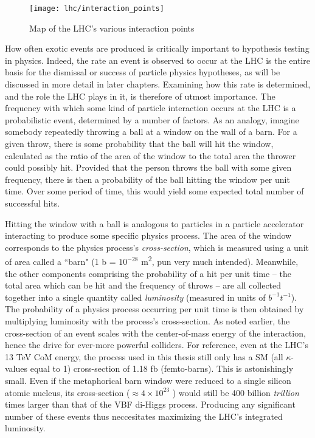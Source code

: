     \begin{figure}[h]
        \texttt{[image: lhc/interaction\_points]}
        \caption{Map of the LHC's various interaction points \cite{lhc_machine}}
        \label{fig:interaction_points}
    \end{figure}

    \FloatBarrier

    How often exotic events are produced is critically important to hypothesis testing in physics.
    Indeed, the rate an event is observed to occur at the LHC is the entire basis for the dismissal or success of particle physics hypotheses, as will be discussed in more detail in later chapters.
    Examining how this rate is determined, and the role the LHC plays in it, is therefore of utmost importance.
    The frequency with which some kind of particle interaction occurs at the LHC is a probabilistic event, determined by a number of factors.
    As an analogy, imagine somebody repeatedly throwing a ball at a window on the wall of a barn.
    For a given throw, there is some probability that the ball will hit the window, calculated as the ratio of the area of the window to the total area the thrower could possibly hit.
    Provided that the person throws the ball with some given frequency, there is then a probability of the ball hitting the window per unit time.
    Over some period of time, this would yield some expected total number of successful hits.

    

    Hitting the window with a ball is analogous to particles in a particle accelerator interacting to produce some specific physics process.
    The area of the window corresponds to the physics process's \textit{cross-section}, which is measured using a unit of area called a ``barn" (1 b = $10^{-28}$ m\textsuperscript{2}, pun very much intended).
    Meanwhile, the other components comprising the probability of a hit per unit time
        -- the total area which can be hit and the frequency of throws --
        are all collected together into a single quantity called \textit{luminosity} (measured in units of $b^{-1}t^{-1}$). 
    The probability of a physics process occurring per unit time is then obtained by multiplying luminosity with the process's cross-section.
    As noted earlier, the cross-section of an event scales with the center-of-mass energy of the interaction,
        hence the drive for ever-more powerful colliders.
    For reference, even at the LHC's 13 TeV CoM energy,
        the \vbfhhproc process used in this thesis still only has a SM (all $\kappa$-values equal to 1) cross-section of 1.18 fb (femto-barns).
    This is astonishingly small.
    Even if the metaphorical barn window were reduced to a single silicon atomic nucleus,
        its cross-section ($\approx 4 \times 10^{23}$ \ifb)
        would still be 400 billion \textit{trillion} times larger than that of the VBF di-Higgs process.
    Producing any significant number of these events thus neccesitates maximizing the LHC's integrated luminosity.

